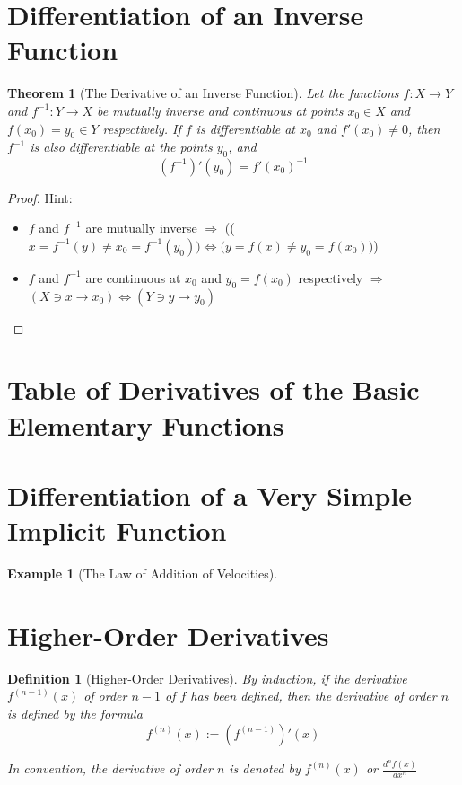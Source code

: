\documentclass[onecolumn]{ctexart}
\newtheorem{definition}{Definition}
\newtheorem{theorem}{Theorem}
\newtheorem{example}{Example}
\begin{document}
\section{Differentiation of an Inverse Function}

\begin{theorem}[The Derivative of an Inverse Function]
  Let the functions $f: X \to Y$ and $f^{-1}: Y \to X$ be mutually inverse and 
  continuous at points $x_0 \in X$ and $f(x_0) = y_0 \in Y$ respectively. If $f$ 
  is differentiable at $x_0$ and $f'(x_0) \neq 0$, then $f^{-1}$ is also 
  differentiable at the points $y_0$, and 
  \[
    (f^{-1})'(y_0) = f'(x_0)^{-1}
  \]
\end{theorem}
\begin{proof}
  Hint:
  \begin{itemize}
    \item $f$ and $f^{-1}$ are mutually inverse $\Rightarrow$ (($x = f^{-1}(y) 
    \neq x_0 = f^{-1}(y_0)) \Leftrightarrow (y = f(x) \neq y_0 = f(x_0)$))
    \item $f$ and $f^{-1}$ are continuous at $x_0$ and $y_0 = f(x_0)$ 
    respectively $\Rightarrow$ $(X \owns x \to x_0) \Leftrightarrow (Y \owns y 
    \to y_0)$
  \end{itemize}
\end{proof}

\section{Table of Derivatives of the Basic Elementary Functions}

\section{Differentiation of a Very Simple Implicit Function}

\begin{example}[The Law of Addition of Velocities]
  
\end{example}

\section{Higher-Order Derivatives}

\begin{definition}[Higher-Order Derivatives]
  By induction, if the derivative $f^{(n-1)}(x)$ of order $n - 1$ of $f$ has 
  been defined, then the derivative of order $n$ is defined by the formula
  \[
    f^{(n)}(x) := (f^{(n-1)})'(x)
  \]

  In convention, the derivative of order $n$ is denoted by $f^{(n)}(x)$ or $\frac{d^n f(x)}{dx^n}$
\end{definition}
\end{document}
